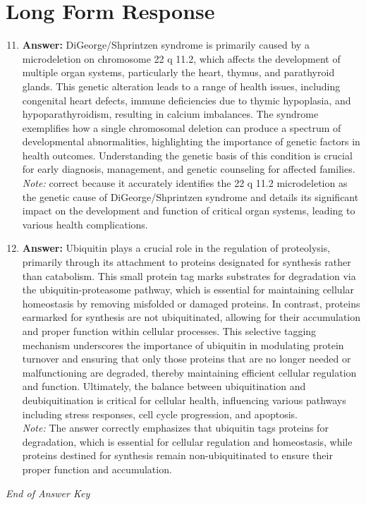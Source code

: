 \documentclass[12pt]{article}
\begin{document}
\section*{Long Form Response}
\begin{enumerate}[label=\arabic*.]
\setcounter{enumi}{10}
\item \textbf{Answer:} DiGeorge/Shprintzen syndrome is primarily caused by a microdeletion on chromosome 22 q 11.2, which affects the development of multiple organ systems, particularly the heart, thymus, and parathyroid glands. This genetic alteration leads to a range of health issues, including congenital heart defects, immune deficiencies due to thymic hypoplasia, and hypoparathyroidism, resulting in calcium imbalances. The syndrome exemplifies how a single chromosomal deletion can produce a spectrum of developmental abnormalities, highlighting the importance of genetic factors in health outcomes. Understanding the genetic basis of this condition is crucial for early diagnosis, management, and genetic counseling for affected families.
\\ \textit{Note:} correct because it accurately identifies the 22 q 11.2 microdeletion as the genetic cause of DiGeorge/Shprintzen syndrome and details its significant impact on the development and function of critical organ systems, leading to various health complications.
\item \textbf{Answer:} Ubiquitin plays a crucial role in the regulation of proteolysis, primarily through its attachment to proteins designated for synthesis rather than catabolism. This small protein tag marks substrates for degradation via the ubiquitin-proteasome pathway, which is essential for maintaining cellular homeostasis by removing misfolded or damaged proteins. In contrast, proteins earmarked for synthesis are not ubiquitinated, allowing for their accumulation and proper function within cellular processes. This selective tagging mechanism underscores the importance of ubiquitin in modulating protein turnover and ensuring that only those proteins that are no longer needed or malfunctioning are degraded, thereby maintaining efficient cellular regulation and function. Ultimately, the balance between ubiquitination and deubiquitination is critical for cellular health, influencing various pathways including stress responses, cell cycle progression, and apoptosis.
\\ \textit{Note:} The answer correctly emphasizes that ubiquitin tags proteins for degradation, which is essential for cellular regulation and homeostasis, while proteins destined for synthesis remain non-ubiquitinated to ensure their proper function and accumulation.
\end{enumerate}

\vfill
\noindent\textit{End of Answer Key}
\end{document}
